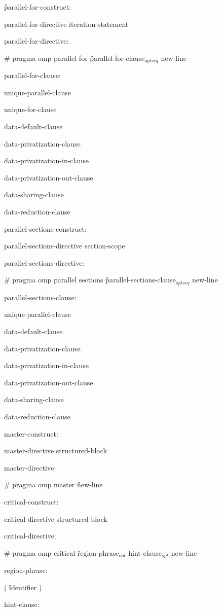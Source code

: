 {\G parallel-for-construct:

\I parallel-for-directive iteration-statement

parallel-for-directive:

\C\I \# pragma omp parallel for \G parallel-for-clause$_{optseq}$ new-line

parallel-for-clause:

\I unique-parallel-clause

\I unique-for-clause

\I data-default-clause 

\I data-privatization-clause 

\I data-privatization-in-clause

\I data-privatization-out-clause 

\I data-sharing-clause 

\I data-reduction-clause 

parallel-sections-construct:

\I parallel-sections-directive section-scope

 parallel-sections-directive:

\C\I \# pragma omp parallel sections \G parallel-sections-clause$_{optseq}$ new-line

parallel-sections-clause:

\I unique-parallel-clause

\I data-default-clause 

\I data-privatization-clause 

\I data-privatization-in-clause

\I data-privatization-out-clause 

\I data-sharing-clause 

\I data-reduction-clause 

master-construct:

\I master-directive structured-block

master-directive:

\C\I \# pragma omp master \G new-line

critical-construct:

\I critical-directive structured-block

critical-directive:

\C\I \# pragma omp critical \G region-phrase$_{opt}$ hint-clause$_{opt}$ new-line

region-phrase:

\C\I ( \G identifier \C )

hint-clause: 

}
